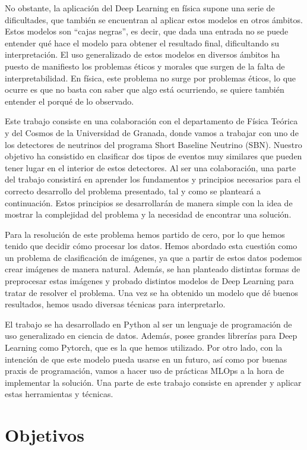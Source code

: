 \documentclass[a4paper,12pt,oneside,titlepage]{book}
\begin{document}
No obstante, la aplicación del Deep Learning en física supone una serie de dificultades, que también se encuentran al aplicar estos modelos en otros ámbitos. Estos modelos son ``cajas negras'', es decir, que dada una entrada no se puede entender qué hace el modelo para obtener el resultado final, dificultando su interpretación. El uso generalizado de estos modelos en diversos ámbitos ha puesto de manifiesto los problemas éticos y morales que surgen de la falta de interpretabilidad. En física, este problema no surge por problemas éticos, lo que ocurre es que no basta con saber que algo está ocurriendo, se quiere también entender el porqué de lo observado.

Este trabajo consiste en una colaboración con el departamento de Física Teórica y del Cosmos de la Universidad de Granada, donde vamos a trabajar con uno de los detectores de neutrinos del programa Short Baseline Neutrino (SBN). Nuestro objetivo ha consistido en clasificar dos tipos de eventos muy similares que pueden tener lugar en el interior de estos detectores. Al ser una colaboración, una parte del trabajo consistirá en aprender los fundamentos y principios necesarios para el correcto desarrollo del problema presentado, tal y como se planteará a continuación. Estos principios se desarrollarán de manera simple con la idea de mostrar la complejidad del problema y la necesidad de encontrar una solución.

Para la resolución de este problema hemos partido de cero, por lo que hemos tenido que decidir cómo procesar los datos. Hemos abordado esta cuestión como un problema de clasificación de imágenes, ya que a partir de estos datos podemos crear imágenes de manera natural. Además, se han planteado distintas formas de preprocesar estas imágenes y probado distintos modelos de Deep Learning para tratar de resolver el problema. Una vez se ha obtenido un modelo que dé buenos resultados, hemos usado diversas técnicas para interpretarlo.

El trabajo se ha desarrollado en Python al ser un lenguaje de programación de uso generalizado en ciencia de datos. Además, posee grandes librerías para Deep Learning como Pytorch, que es la que hemos utilizado. Por otro lado, con la intención de que este modelo pueda usarse en un futuro, así como por buenas praxis de programación, vamos a hacer uso de prácticas MLOps a la hora de implementar la solución. Una parte de este trabajo consiste en aprender y aplicar estas herramientas y técnicas.

\section{Objetivos}
\end{document}
